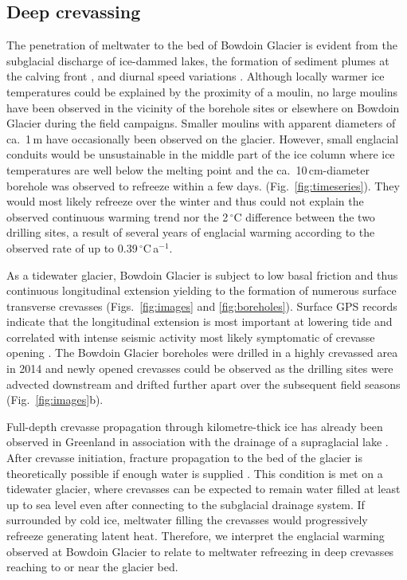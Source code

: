 \documentclass[utf8]{article}
\begin{document}
\subsection{Deep crevassing}

    The penetration of meltwater to the bed of Bowdoin Glacier is evident from
    the subglacial discharge of ice-dammed lakes, the formation of sediment
    plumes at the calving front \citep{Jouvet.etal.2018, Kanna.etal.2018}, and
    diurnal speed variations \citep{Sugiyama.etal.2014, Podolskiy.etal.2016}.
    Although locally warmer ice temperatures could be explained by the
    proximity of a moulin, no large moulins have been observed in the vicinity
    of the borehole sites or elsewhere on Bowdoin Glacier during the field
    campaigns. Smaller moulins with apparent diameters of ca.~1\,m have
    occasionally been observed on the glacier. However, small englacial
    conduits would be unsustainable in the middle part of the ice column where
    ice temperatures are well below the melting point and the
    ca.~10\,cm-diameter borehole was observed to refreeze within a few days.
    (Fig.~\ref{fig:timeseries}). They would
    most likely refreeze over the winter and thus could not explain the
    observed continuous warming trend nor the 2\,$^\circ$C difference between
    the two drilling sites, a result of several years of englacial warming
    according to the observed rate of up to 0.39\,$^\circ$C\,a$^{-1}$.

    As a tidewater glacier, Bowdoin Glacier is subject to low basal friction
    \citep{Seddik.etal.2019} and
    thus continuous longitudinal extension yielding to the formation of
    numerous surface transverse crevasses (Figs.~\ref{fig:images} and
    \ref{fig:boreholes}). Surface GPS records indicate that the longitudinal
    extension is most important at lowering tide and correlated with intense
    seismic activity most likely symptomatic of crevasse opening
    \citep{Podolskiy.etal.2016, Podolskiy.etal.2017}.
    The Bowdoin Glacier boreholes were drilled in a highly crevassed area in
    2014 and newly opened crevasses could be observed as the drilling sites
    were
    advected downstream and drifted further apart over the subsequent field
    seasons (Fig.~\ref{fig:images}b).

    Full-depth crevasse propagation through kilometre-thick ice has already
    been observed in Greenland in association with the drainage of a
    supraglacial
    lake \citep{Das.etal.2008}. After crevasse initiation, fracture propagation
    to the bed of the glacier is theoretically possible if enough water is
    supplied \citep{Veen.2007}. This condition is met on a tidewater glacier,
    where crevasses can be expected to remain water filled at least up to sea
    level even after connecting to the subglacial drainage system. If
    surrounded by cold ice, meltwater filling the crevasses would progressively
    refreeze generating latent heat. Therefore, we interpret the englacial
    warming observed at Bowdoin Glacier to relate to meltwater refreezing in
    deep crevasses reaching to or near the glacier bed.
\end{document}
